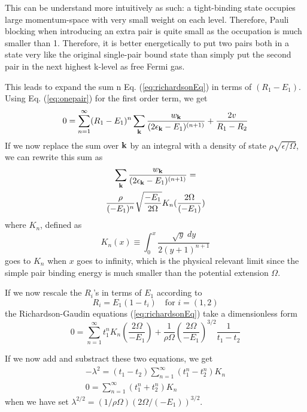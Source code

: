 \documentclass[aps,prb,showpacs,3p,twocolumn]{elsarticle}
\begin{document}
This can be understand more intuitively as such: a tight-binding state occupies large momentum-space with very small weight on each level. Therefore, Pauli blocking when introducing an extra pair is quite small as the occupation is much smaller than 1. Therefore, it is better energetically to put two pairs both in a state very like the original single-pair bound state than simply put the second pair in the next highest k-level as free Fermi gas.   

This leads to expand the sum n Eq. (\ref{eq:richardsonEq}) in terms of $(R_{1}-E_{1})$.  Using Eq. (\ref{eq:onepair}) for the first order term, we get
\begin{equation}
0=\sum_{n=1}^{\infty}(R_{1}-E_{1})^{n}\sum_{\mathbf{k}}\frac{w_{\mathbf{k}}}{(2\epsilon_{\mathbf{k}}-E_1)^{(n+1)}}+\frac{2v}{R_1-R_2}
\end{equation}
If we now replace the sum over $\mathbf{k}$ by an integral with a density of state $\rho\sqrt{\epsilon/\Omega}$, we can rewrite this sum as
\begin{multline}
\sum_{\mathbf{k}}\frac{w_{\mathbf{k}}}{(2\epsilon_{\mathbf{k}}-E_1)^{(n+1)}}=\\\frac{\rho}{(-E_{1})^{n}}\sqrt{\frac{-E_{1}}{2\Omega}}K_{n}(\frac{2\Omega}{(-E_{1})})
\end{multline}
where $K_{n}$, defined as
\begin{equation}
K_{n}(x)\equiv\int_{0}^{x}\frac{\sqrt{y}\;dy}{2(y+1)^{n+1}}
\end{equation}
goes to $K_{n}$ when $x$ goes to infinity, which is the physical relevant limit since the simple pair binding energy is much smaller than the potential extension $\Omega$.

If we now rescale the $R_{i}$'s in terms of $E_{1}$ according to
\begin{equation}
R_{i}=E_{1}(1-t_{i})\quad\text{for }i=(1,2)
\end{equation}
the Richardson-Gaudin equations (\ref{eq:richardsonEq}) take a dimensionless form
\begin{equation}
0=\sum_{n=1}^{\infty}t_{1}^{n}K_{n}(\frac{2\Omega}{-E_{1}})+\frac{1}{\rho\Omega}\left(\frac{2\Omega}{-E_{1}}\right)^{3/2}\frac{1}{t_1-t_2}
\end{equation}

If we now add and substract these two equations, we get
\begin{gather}
-\lambda^{2}=(t_{1}-t_{2})\sum_{n=1}^{\infty}(t_{1}^{n}-t_{2}^{n})K_{n}\label{eq:t1}\\
0=\sum_{n=1}^{\infty}(t_{1}^{n}+t_{2}^{n})K_{n}\label{eq:t2}
\end{gather}
when we have set $\lambda^{2/2}=(1/\rho\Omega)(2\Omega/(-E_{1}))^{3/2}$.
\end{document}
